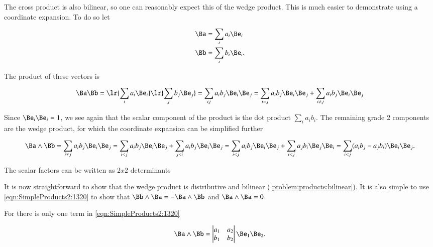 The cross product is also bilinear, so one can reasonably expect this of the wedge product.
This is much easier to demonstrate using a coordinate expansion.
To do so let

\begin{dmath}\label{eqn:SimpleProducts2:1160}
\begin{aligned}
\Ba &= \sum_i a_i \Be_i \\
\Bb &= \sum_i b_i \Be_i.
\end{aligned}
\end{dmath}

The product of these vectors is

\begin{dmath}\label{eqn:SimpleProducts2:1360}
\Ba \Bb
=
\lr{ \sum_i a_i \Be_i } \lr{ \sum_j b_j \Be_j }
=
\sum_{ij} a_i b_j \Be_i \Be_j
=
\sum_{i = j} a_i b_j \Be_i \Be_j
+
\sum_{i \ne j} a_i b_j \Be_i \Be_j
\end{dmath}

Since \( \Be_i \Be_i = 1 \), we see again that the scalar component of the product is the dot product \( \sum_i a_i b_i \).
The remaining grade 2 components are the wedge product, for which the coordinate expansion can be simplified further

\begin{dmath}\label{eqn:SimpleProducts2:1460}
\Ba \wedge \Bb
=
\sum_{i \ne j} a_i b_j \Be_i \Be_j
=
\sum_{i < j} a_i b_j \Be_i \Be_j
+
\sum_{j < i} a_i b_j \Be_i \Be_j
=
\sum_{i < j} a_i b_j \Be_i \Be_j
+
\sum_{i < j} a_j b_i \Be_j \Be_i
=
\sum_{i < j} (a_i b_j - a_j b_i) \Be_i \Be_j.
\end{dmath}

The scalar factors can be written as \( 2 x 2 \) determinants


It is now straightforward to show that the wedge product is distributive and bilinear (\cref{problem:products:bilinear}).
It is also simple to use \cref{eqn:SimpleProducts2:1320} to show that \( \Bb \wedge \Ba = -\Ba \wedge \Bb \) and \( \Ba \wedge \Ba = 0 \).

For  there is only one term in \cref{eqn:SimpleProducts2:1320}

\begin{dmath}\label{eqn:SimpleProducts2:1720}
\Ba \wedge \Bb
=
\begin{vmatrix}
a_1 & a_2 \\
b_1 & b_2
\end{vmatrix}
\Be_1 \Be_2.
\end{dmath}

